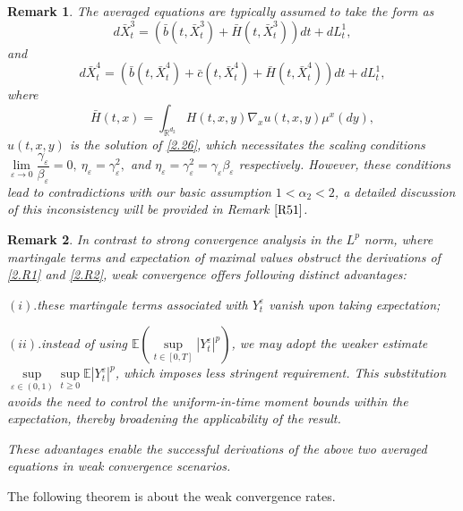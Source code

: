 \documentclass[11pt,reqno]{amsart}
\newtheorem{remark}{\indent Remark}[section]
\numberwithin{equation}{section}
\begin{document}
\begin{remark}\label{R21}
The averaged equations are typically assumed to take the form as
	\begin{equation}\label{2.R1}
	d\bar{X}^{3}_{t}=(\bar{b}(t,\bar{X}^{3}_{t})+\bar{H}(t,\bar{X}^{3}_{t}))dt+dL_{t}^{1},
\end{equation}
and
\begin{equation}\label{2.R2}
	d\bar{X}^{4}_{t}=(\bar{b}(t,\bar{X}^{4}_{t})+\bar{c}(t,\bar{X}^{4}_{t})+\bar{H}(t,\bar{X}^{4}_{t}))dt+dL_{t}^{1},
\end{equation}
where \begin{equation}
	\bar{H}(t,x)=\int_{\mathbb{R}^{ d_{2}}}H(t,x,y)\nabla_{x}u(t,x,y)\mu^{x}(dy),
	\nonumber
\end{equation}
$u(t,x,y)$ is the solution of \eqref{2.26}, which necessitates the scaling conditions $ \lim\limits_{\varepsilon \rightarrow0}\dfrac{\gamma_{\varepsilon}}{\beta_{\varepsilon} }=0,\ \eta_{\varepsilon}=\gamma_{\varepsilon}^{2},$
 and $\eta_{\varepsilon}=\gamma_{\varepsilon}^{2}=\gamma_{\varepsilon}\beta_{\varepsilon}$ respectively. However, these conditions lead to contradictions with our basic  assumption  $1<\alpha_{2}<2$, a detailed discussion of this inconsistency will be provided in Remark $\ref{R51}$.
\end{remark}


\begin{remark}\label{R22}
	In contrast to strong convergence analysis in the
	$L^{p}$ norm, where martingale terms and expectation of maximal values obstruct the derivations of \eqref{2.R1} and \eqref{2.R2}, weak convergence offers following distinct advantages: 
	
	$(i).$these martingale terms associated with  $ Y^{\varepsilon}_{t}$ vanish upon taking expectation;
	
	$(ii).$instead of using $\mathbb{E}(\underset{t\in [0,T]}{\sup} |Y_{t}^{\varepsilon}|^{p})$, we may adopt the weaker estimate  $\underset{\varepsilon\in (0,1)}{\sup}\underset{t\geq0}{\sup}\mathbb{E} |Y_{t}^{\varepsilon}|^{p}$, which imposes  less stringent requirement. This substitution avoids the need to control the uniform-in-time moment bounds within the expectation, thereby broadening the applicability of the result.
	
	These advantages enable the successful derivations of the above two averaged equations in weak convergence scenarios.
\end{remark}

The following theorem is about the weak convergence rates.
\end{document}
